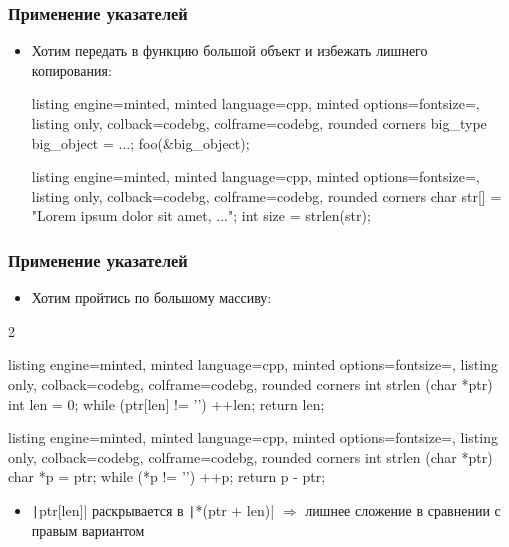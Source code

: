\documentclass[10pt]{beamer}
\begin{document}
\begin{frame}[fragile]
\frametitle{Применение указателей}
\begin{itemize}
\item Хотим передать в функцию большой объект и избежать лишнего копирования:
\begin{tcblisting}{listing engine=minted, minted language=cpp, minted options={fontsize=\scriptsize}, listing only, colback=codebg, colframe=codebg, rounded corners}
big_type big_object = ...;
foo(&big_object);
\end{tcblisting}
\pause
\begin{tcblisting}{listing engine=minted, minted language=cpp, minted options={fontsize=\scriptsize}, listing only, colback=codebg, colframe=codebg, rounded corners}
char str[] = "Lorem ipsum dolor sit amet, ...";
int size = strlen(str);
\end{tcblisting}
\end{itemize}
\end{frame}

\begin{frame}[fragile]
\frametitle{Применение указателей}
\begin{itemize}
\item Хотим пройтись по большому массиву:
\end{itemize}
\begin{multicols}{2}
\begin{tcblisting}{listing engine=minted, minted language=cpp, minted options={fontsize=\scriptsize}, listing only, colback=codebg, colframe=codebg, rounded corners}
int strlen (char *ptr) {
  int len = 0;
  while (ptr[len] != '\0') {
    ++len;
  }
  return len;
}
\end{tcblisting}
\columnbreak
\begin{tcblisting}{listing engine=minted, minted language=cpp, minted options={fontsize=\scriptsize}, listing only, colback=codebg, colframe=codebg, rounded corners}
int strlen (char *ptr) {
  char *p = ptr;
  while (*p != '\0') {
    ++p;
  }
  return p - ptr;
}
\end{tcblisting}
\end{multicols}
\pause
\begin{itemize}
\item \texttt|ptr[len]| раскрывается в \texttt|*(ptr + len)| \(\Longrightarrow\) лишнее сложение в сравнении с правым вариантом
\end{itemize}
\end{frame}
\end{document}
